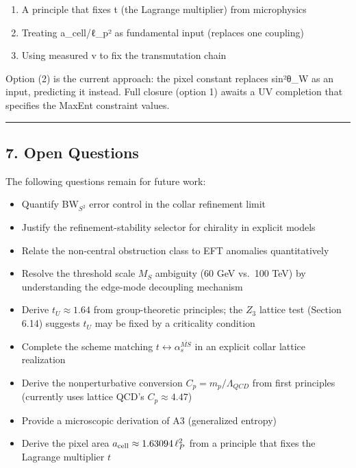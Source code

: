 \documentclass[
]{article}
\providecommand{\tightlist}{%
  \setlength{\itemsep}{0pt}\setlength{\parskip}{0pt}}
\begin{document}
\begin{enumerate}
\def\labelenumi{\arabic{enumi}.}
\tightlist
\item
  A principle that fixes t (the Lagrange multiplier) from microphysics
\item
  Treating a\_cell/ℓ\_p² as fundamental input (replaces one coupling)
\item
  Using measured v to fix the transmutation chain
\end{enumerate}

Option (2) is the current approach: the pixel constant replaces sin²θ\_W
as an input, predicting it instead. Full closure (option 1) awaits a UV
completion that specifies the MaxEnt constraint values.

\begin{center}\rule{0.5\linewidth}{0.5pt}\end{center}

\subsection{7. Open Questions}\label{open-questions}

The following questions remain for future work:

\begin{itemize}
\tightlist
\item
  Quantify BW\(_{S^2}\) error control in the collar refinement limit
\item
  Justify the refinement-stability selector for chirality in explicit
  models
\item
  Relate the non-central obstruction class to EFT anomalies
  quantitatively
\item
  Resolve the threshold scale \(M_S\) ambiguity (60 GeV vs.~100 TeV) by
  understanding the edge-mode decoupling mechanism
\item
  Derive \(t_U \approx 1.64\) from group-theoretic principles; the
  \(Z_3\) lattice test (Section 6.14) suggests \(t_U\) may be fixed by a
  criticality condition
\item
  Complete the scheme matching
  \(t \leftrightarrow \alpha_s^{\overline{MS}}\) in an explicit collar
  lattice realization
\item
  Derive the nonperturbative conversion \(C_p = m_p/\Lambda_{QCD}\) from
  first principles (currently uses lattice QCD's \(C_p \approx 4.47\))
\item
  Provide a microscopic derivation of A3 (generalized entropy)
\item
  Derive the pixel area \(a_{\rm cell} \approx 1.63094\,\ell_P^2\) from
  a principle that fixes the Lagrange multiplier \(t\)
\end{itemize}
\end{document}
